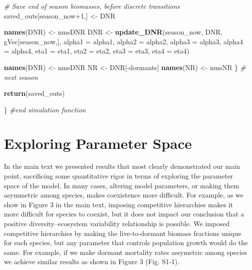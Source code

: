 \documentclass[11pt,]{article}
\newenvironment{Shaded}{\begin{snugshade}}{\end{snugshade}}
\newcommand{\KeywordTok}[1]{\textcolor[rgb]{0.13,0.29,0.53}{\textbf{{#1}}}}
\newcommand{\DataTypeTok}[1]{\textcolor[rgb]{0.13,0.29,0.53}{{#1}}}
\newcommand{\DecValTok}[1]{\textcolor[rgb]{0.00,0.00,0.81}{{#1}}}
\newcommand{\StringTok}[1]{\textcolor[rgb]{0.31,0.60,0.02}{{#1}}}
\newcommand{\CommentTok}[1]{\textcolor[rgb]{0.56,0.35,0.01}{\textit{{#1}}}}
\newcommand{\NormalTok}[1]{{#1}}
\begin{document}
\begin{Shaded}
\begin{Highlighting}[]
    \CommentTok{# Save end of season biomasses, before discrete transitions}
    \NormalTok{saved_outs[season_now}\DecValTok{+1}\NormalTok{,] <-}\StringTok{ }\NormalTok{DNR}
    
    \KeywordTok{names}\NormalTok{(DNR) <-}\StringTok{ }\NormalTok{nmsDNR}
    \NormalTok{DNR        <-}\StringTok{ }\KeywordTok{update_DNR}\NormalTok{(season_now, DNR, gVec[season_now,],}
                             \DataTypeTok{alpha1 =} \NormalTok{alpha1, }\DataTypeTok{alpha2 =} \NormalTok{alpha2, }
                             \DataTypeTok{alpha3 =} \NormalTok{alpha3, }\DataTypeTok{alpha4 =} \NormalTok{alpha4,}
                             \DataTypeTok{eta1 =} \NormalTok{eta1, }\DataTypeTok{eta2 =} \NormalTok{eta2, }\DataTypeTok{eta3 =} \NormalTok{eta3, }\DataTypeTok{eta4 =} \NormalTok{eta4)}
    
    \KeywordTok{names}\NormalTok{(DNR) <-}\StringTok{ }\NormalTok{nmsDNR}
    \NormalTok{NR         <-}\StringTok{ }\NormalTok{DNR[-dormants]  }
    \KeywordTok{names}\NormalTok{(NR)  <-}\StringTok{ }\NormalTok{nmsNR}
  \NormalTok{\} }\CommentTok{# next season}
  
  \KeywordTok{return}\NormalTok{(saved_outs)}
  
\NormalTok{\} }\CommentTok{#end simulation function}
\end{Highlighting}
\end{Shaded}

\section{Exploring Parameter Space}

In the main text we presented results that most clearly demonstrated our
main point, sacrificing some quantitative rigor in terms of exploring
the parameter space of the model. In many cases, altering model
parameters, or making them asymmetric among species, makes coexistence
more difficult. For example, as we show in Figure 3 in the main text,
imposing competitive hierarchies makes it more difficult for species to
coexist, but it does not impact our conclusion that a positive
diversity--ecosystem variability relationship is possible. We imposed
competitive hierarchies by making the live-to-dormant biomass fractions
unique for each species, but any parameter that controls population
growth would do the same. For example, if we make dormant mortality
rates assymetric among species we achieve similar results as shown in
Figure 3 (Fig. S1-1).
\end{document}

